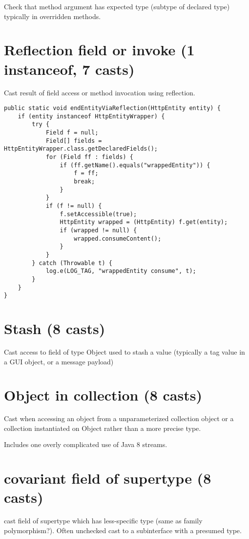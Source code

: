 Check that method argument has expected type (subtype of declared type) typically in overridden methods. 

\section{Reflection field or invoke (1 instanceof, 7 casts)}
\label{sec:orge17c719}

Cast result of field access or method invocation using reflection. 

\lstset{language=java,label= ,caption= ,captionpos=b,numbers=none}
\begin{lstlisting}
public static void endEntityViaReflection(HttpEntity entity) { 
    if (entity instanceof HttpEntityWrapper) { 
        try { 
            Field f = null; 
            Field[] fields = HttpEntityWrapper.class.getDeclaredFields(); 
            for (Field ff : fields) { 
                if (ff.getName().equals("wrappedEntity")) { 
                    f = ff; 
                    break; 
                } 
            } 
            if (f != null) { 
                f.setAccessible(true); 
                HttpEntity wrapped = (HttpEntity) f.get(entity); 
                if (wrapped != null) { 
                    wrapped.consumeContent(); 
                } 
            } 
        } catch (Throwable t) { 
            log.e(LOG_TAG, "wrappedEntity consume", t); 
        } 
    } 
} 
\end{lstlisting}
\section{Stash (8 casts)}
\label{sec:orge078c3e}

Cast access to field of type Object used to stash a value (typically a tag value in a GUI object, or a message payload) 

\section{Object in collection (8 casts)}
\label{sec:org46d12bb}
Cast when accessing an object from a unparameterized collection object or a collection instantiated on Object rather than a more precise type. 

Includes one overly complicated use of Java 8 streams. 

\section{covariant field of supertype (8 casts)}
\label{sec:org04791cf}
cast field of supertype which has less-specific type (same as family polymorphism?). 
Often unchecked cast to a subinterface with a presumed type. 

